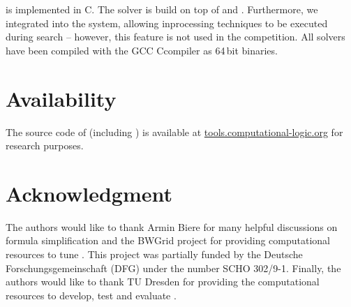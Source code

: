 \documentclass[conference]{IEEEtran}
\def\CC{{C\nolinebreak[4]\hspace{-.05em}\raisebox{.4ex}{\tiny\bf ++}}}
\begin{document}
\sparrow is implemented in C.
%
The solver \riss is build on top of \minisat and \glucose. Furthermore, we integrated \cp into the system, allowing inprocessing techniques to be executed during search -- however, this feature is not used in the competition. 
%
All solvers have been compiled with the GCC \CC compiler as  64\,bit binaries.
 
\section{Availability}

The source code of \riss (including \cpt) is available at \url{tools.computational-logic.org} for research purposes. 

\section*{Acknowledgment}
The authors would like to thank Armin Biere for many helpful discussions on formula simplification and the BWGrid \cite{bwgrid} project for providing computational resources to tune \cpt. 
This project was partially funded by the Deutsche Forschungsgemeinschaft (DFG) under the number SCHO 302/9-1.
Finally, the authors would like to thank TU Dresden for providing the computational resources to develop, test and evaluate \riss.




\end{document}
